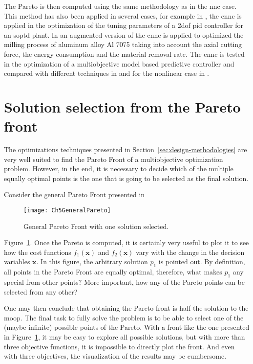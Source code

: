 The Pareto is then computed using the same methodology as in the \gls{nnc} case. This method has also been applied in several cases, for example in \cite{Contreras-Leiva2016}, the \gls{ennc} is applied in the optimization of the tuning parameters of a \gls{2dof} \gls{pid} controller for an \gls{soptd} plant. In\cite{Pereira2017b} an augmented version of the \gls{ennc} is applied to optimized the milling process of aluminum alloy Al 7075 taking into account the axial cutting force, the energy consumption and the material removal rate. The \gls{ennc} is tested in the optimization of a multiobjective model based predictive controller and compared with different techniques in \cite{Toro2011} and for the nonlinear case in \cite{Vallerio2014}.
\section{Solution selection from the Pareto front}
\label{sec:Selection}
The optimizations techniques presented in Section~\ref{sec:design-methodologies} are very well suited to find the Pareto Front of a multiobjective optimization problem. However, in the end, it is necessary to decide which of the multiple equally optimal points is the one that is going to be selected as the final solution.

Consider the general Pareto Front presented in 
\begin{figure}[b]
	\centering
	\texttt{[image: Ch5GeneralPareto]}
	\caption{General Pareto Front with one solution selected.}
	\label{fig:Ch5GeneralPareto}
\end{figure}
%
Figure~\ref{fig:Ch5GeneralPareto}. Once the Pareto is computed, it is certainly very useful to plot it to see how the cost functions $f_1(\mathbf{x})$ and $f_2(\mathbf{x})$ vary with the change in the decision variables $\mathbf{x}$. In this figure, the arbitrary solution $p_1$ is pointed out. By definition, all points in the Pareto Front are equally optimal, therefore, what makes $p_1$ any special from other points? More important, how any of the Pareto points can be selected from any other?

One may then conclude that obtaining the Pareto front is half the solution to the \gls{moop}. The final task to fully solve the problem is to be able to select one of the (maybe infinite) possible points of the Pareto. With a front like the one presented in Figure~\ref{fig:Ch5GeneralPareto}, it may be easy to explore all possible solutions, but with more than three objective functions, it is impossible to directly plot the front. And even with three objectives, the visualization of the results may be cumbersome.

